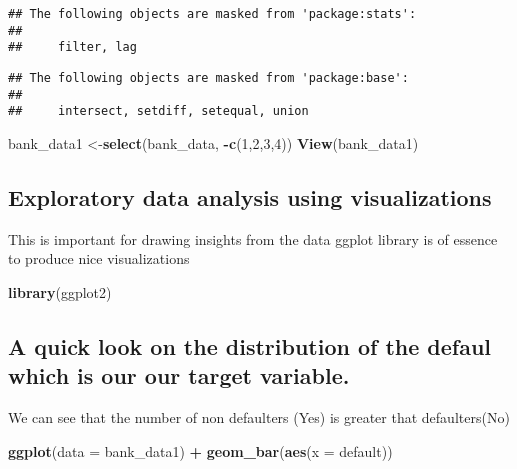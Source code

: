 \documentclass[]{article}
\newenvironment{Shaded}{\begin{snugshade}}{\end{snugshade}}
\newcommand{\DataTypeTok}[1]{\textcolor[rgb]{0.13,0.29,0.53}{#1}}
\newcommand{\DecValTok}[1]{\textcolor[rgb]{0.00,0.00,0.81}{#1}}
\newcommand{\KeywordTok}[1]{\textcolor[rgb]{0.13,0.29,0.53}{\textbf{#1}}}
\newcommand{\NormalTok}[1]{#1}
\newcommand{\OperatorTok}[1]{\textcolor[rgb]{0.81,0.36,0.00}{\textbf{#1}}}
\newcommand{\StringTok}[1]{\textcolor[rgb]{0.31,0.60,0.02}{#1}}
\begin{document}
\begin{verbatim}
## The following objects are masked from 'package:stats':
## 
##     filter, lag
\end{verbatim}

\begin{verbatim}
## The following objects are masked from 'package:base':
## 
##     intersect, setdiff, setequal, union
\end{verbatim}

\begin{Shaded}
\begin{Highlighting}[]
\NormalTok{bank_data1 <-}\KeywordTok{select}\NormalTok{(bank_data, }\OperatorTok{-}\KeywordTok{c}\NormalTok{(}\DecValTok{1}\NormalTok{,}\DecValTok{2}\NormalTok{,}\DecValTok{3}\NormalTok{,}\DecValTok{4}\NormalTok{))}
\KeywordTok{View}\NormalTok{(bank_data1)}
\end{Highlighting}
\end{Shaded}

\hypertarget{exploratory-data-analysis-using-visualizations}{%
\subsection{Exploratory data analysis using
visualizations}\label{exploratory-data-analysis-using-visualizations}}

This is important for drawing insights from the data ggplot library is
of essence to produce nice visualizations

\begin{Shaded}
\begin{Highlighting}[]
\KeywordTok{library}\NormalTok{(ggplot2)}
\end{Highlighting}
\end{Shaded}

\hypertarget{a-quick-look-on-the-distribution-of-the-defaul-which-is-our-our-target-variable.}{%
\subsection{A quick look on the distribution of the defaul which is our
our target
variable.}\label{a-quick-look-on-the-distribution-of-the-defaul-which-is-our-our-target-variable.}}

We can see that the number of non defaulters (Yes) is greater that
defaulters(No)

\begin{Shaded}
\begin{Highlighting}[]
\KeywordTok{ggplot}\NormalTok{(}\DataTypeTok{data =}\NormalTok{ bank_data1) }\OperatorTok{+}
\StringTok{  }\KeywordTok{geom_bar}\NormalTok{(}\KeywordTok{aes}\NormalTok{(}\DataTypeTok{x =}\NormalTok{ default))}
\end{Highlighting}
\end{Shaded}
\end{document}
